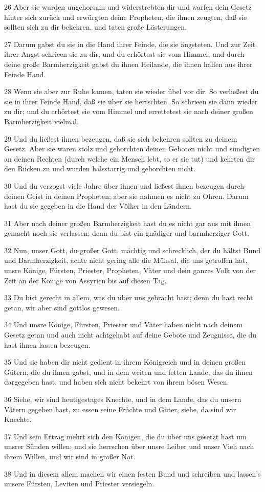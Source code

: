 \par 26 Aber sie wurden ungehorsam und widerstrebten dir und warfen dein Gesetz hinter sich zurück und erwürgten deine Propheten, die ihnen zeugten, daß sie sollten sich zu dir bekehren, und taten große Lästerungen.
\par 27 Darum gabst du sie in die Hand ihrer Feinde, die sie ängsteten. Und zur Zeit ihrer Angst schrieen sie zu dir; und du erhörtest sie vom Himmel, und durch deine große Barmherzigkeit gabst du ihnen Heilande, die ihnen halfen aus ihrer Feinde Hand.
\par 28 Wenn sie aber zur Ruhe kamen, taten sie wieder übel vor dir. So verließest du sie in ihrer Feinde Hand, daß sie über sie herrschten. So schrieen sie dann wieder zu dir; und du erhörtest sie vom Himmel und errettetest sie nach deiner großen Barmherzigkeit vielmal.
\par 29 Und du ließest ihnen bezeugen, daß sie sich bekehren sollten zu deinem Gesetz. Aber sie waren stolz und gehorchten deinen Geboten nicht und sündigten an deinen Rechten (durch welche ein Mensch lebt, so er sie tut) und kehrten dir den Rücken zu und wurden halsstarrig und gehorchten nicht.
\par 30 Und du verzogst viele Jahre über ihnen und ließest ihnen bezeugen durch deinen Geist in deinen Propheten; aber sie nahmen es nicht zu Ohren. Darum hast du sie gegeben in die Hand der Völker in den Ländern.
\par 31 Aber nach deiner großen Barmherzigkeit hast du es nicht gar aus mit ihnen gemacht noch sie verlassen; denn du bist ein gnädiger und barmherziger Gott.
\par 32 Nun, unser Gott, du großer Gott, mächtig und schrecklich, der du hältst Bund und Barmherzigkeit, achte nicht gering alle die Mühsal, die uns getroffen hat, unsre Könige, Fürsten, Priester, Propheten, Väter und dein ganzes Volk von der Zeit an der Könige von Assyrien bis auf diesen Tag.
\par 33 Du bist gerecht in allem, was du über uns gebracht hast; denn du hast recht getan, wir aber sind gottlos gewesen.
\par 34 Und unsre Könige, Fürsten, Priester und Väter haben nicht nach deinem Gesetz getan und auch nicht achtgehabt auf deine Gebote und Zeugnisse, die du hast ihnen lassen bezeugen.
\par 35 Und sie haben dir nicht gedient in ihrem Königreich und in deinen großen Gütern, die du ihnen gabst, und in dem weiten und fetten Lande, das du ihnen dargegeben hast, und haben sich nicht bekehrt von ihrem bösen Wesen.
\par 36 Siehe, wir sind heutigestages Knechte, und in dem Lande, das du unsern Vätern gegeben hast, zu essen seine Früchte und Güter, siehe, da sind wir Knechte.
\par 37 Und sein Ertrag mehrt sich den Königen, die du über uns gesetzt hast um unsrer Sünden willen; und sie herrschen über unsre Leiber und unser Vieh nach ihrem Willen, und wir sind in großer Not.
\par 38 Und in diesem allem machen wir einen festen Bund und schreiben und lassen's unsere Fürsten, Leviten und Priester versiegeln.

